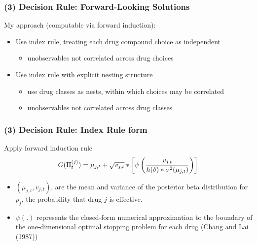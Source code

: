 \documentclass[xcolor=pdftex,dvipsnames,table,mathserif,aspectratio=169]{beamer}
\begin{document}
\begin{frame}
\frametitle{(3) Decision Rule: Forward-Looking Solutions}
\small

My approach (computable via forward induction):

\begin{itemize}
\item Use index rule, treating each drug compound choice as independent

\begin{itemize}
\item unobservables not correlated across drug choices
\end{itemize}

\item Use index rule with explicit nesting structure

\begin{itemize}
\item use drug classes as nests, within which choices may be correlated

\item unobservables not correlated across drug classes
\end{itemize}
\end{itemize}
\end{frame}


\begin{frame}[label=RULE]

\frametitle{(3) Decision Rule: Index Rule form}
\small

Apply forward induction rule 
\[
G(\Pi _{t}^{(j)})=\mu _{j,t}+\sqrt{v_{j,t}}*\left[\psi \left( \frac{v_{j,t}}{%
h(\delta)\ast \sigma ^{2}(\mu _{j,t})}\right)\right]
\]

\begin{itemize}
\item $(\mu _{j,t},v_{j,t})$, are the mean and variance of the posterior
beta distribution for $p_{j}$, the probability that drug $j$ is effective.

\item $\psi(.)$ represents the closed-form numerical approximation to the
boundary of the one-dimensional optimal stopping problem for each drug
(Chang and Lai (1987))
\end{itemize}
\end{frame}

\end{document}
